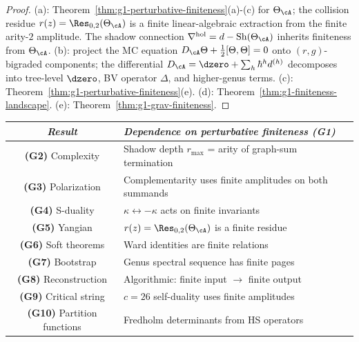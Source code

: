 \begin{proof}
(a): Theorem~\ref{thm:g1-perturbative-finiteness}(a)-(c) for
$\Theta_\cA$; the collision residue
$r(z) = \Res_{0,2}(\Theta_\cA)$ is a finite linear-algebraic
extraction from the finite arity-$2$ amplitude.  The shadow
connection $\nabla^{\mathrm{hol}} = d -
\operatorname{Sh}(\Theta_\cA)$ inherits finiteness from
$\Theta_\cA$.
(b): project the MC equation
$D_\cA\Theta + \frac{1}{2}[\Theta,\Theta] = 0$ onto
$(r,g)$-bigraded components; the differential $D_\cA =
\dzero + \sum_h \hbar^h d^{(h)}$ decomposes into tree-level
$\dzero$, BV operator $\Delta$, and higher-genus terms.
(c): Theorem~\ref{thm:g1-perturbative-finiteness}(e).
(d): Theorem~\ref{thm:g1-finiteness-landscape}.
(e): Theorem~\ref{thm:g1-grav-finiteness}.
\end{proof}

\begin{center}
\renewcommand{\arraystretch}{1.3}
\begin{tabular}{c|l}
\emph{Result} & \emph{Dependence on perturbative finiteness (G1)}
\\[2pt]\hline\hline
\textbf{(G2)} Complexity &
  Shadow depth $r_{\max}$ = arity of graph-sum termination \\
\textbf{(G3)} Polarization &
  Complementarity uses finite amplitudes on both summands \\
\textbf{(G4)} S-duality &
  $\kappa \leftrightarrow -\kappa$ acts on finite invariants \\
\textbf{(G5)} Yangian &
  $r(z) = \Res_{0,2}(\Theta_\cA)$ is a finite residue \\
\textbf{(G6)} Soft theorems &
  Ward identities are finite relations \\
\textbf{(G7)} Bootstrap &
  Genus spectral sequence has finite pages \\
\textbf{(G8)} Reconstruction &
  Algorithmic: finite input $\to$ finite output \\
\textbf{(G9)} Critical string &
  $c = 26$ self-duality uses finite amplitudes \\
\textbf{(G10)} Partition functions &
  Fredholm determinants from HS operators
\end{tabular}
\end{center}
